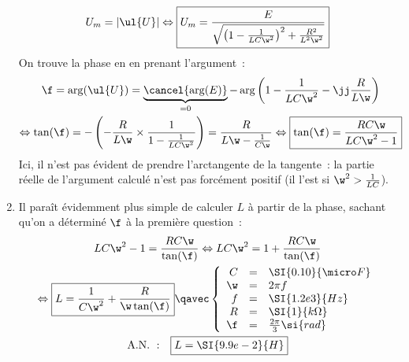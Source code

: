 \documentclass[a4paper, 12pt, final, garamond]{book}
\begin{document}
\begin{enumerate}
	      \begin{gather*}
		      U_m
		      = \left| \ul{U} \right|
		      \Leftrightarrow
		      \boxed{U_m
			      = \frac{E}{\sqrt{\left(1 - \frac{1}{LC\w^2}\right)^2 +
					      \frac{R^2}{L^2\w^2}}}
		      }
	      \end{gather*}
	      On trouve la phase en en prenant l'argument~:
	      \begin{gather*}
		      \f
		      = \arg(\ul{U})
		      = \underbrace{\cancel{\arg(E)}}_{=0}
		      - \arg \left( 1 - \frac{1}{LC\w^2} - \jj \frac{R}{L\w}
		      \right)\\
		      \Leftrightarrow
		      \tan(\f)
		      = - \left(-\frac{R}{L\w}\times \frac{1}{1 - \frac{1}{LC\w^2}}\right)
		      = \frac{R}{L\w - \frac{1}{C\w}}
		      \Leftrightarrow
		      \boxed{\tan(\f)
			      = \frac{RC\w}{LC\w^2 - 1}
		      }
	      \end{gather*}
	      Ici, il n'est pas évident de prendre l'arctangente de la tangente~: la
	      partie réelle de l'argument calculé n'est pas forcément positif (il
	      l'est si $\w^2 > \frac{1}{LC}$).
	\item Il paraît évidemment plus simple de calculer $L$ à partir de la phase,
	      sachant qu'on a déterminé $\f$ à la première question~:
	      \begin{gather*}
		      LC\w^2 - 1
		      = \frac{RC\w}{\tan(\f)}
		      \Leftrightarrow
		      LC\w^2 = 1 + \frac{RC\w}{\tan(\f)}\\
		      \Leftrightarrow
		      \boxed{L = \frac{1}{C\w^2} + \frac{R}{\w\tan(\f)}}
		      \qavec
		      \left\{
		      \begin{array}{rcl}
			      C  & = & \SI{0.10}{\micro F}    \\
			      \w & = & 2\pi f                 \\
			      f  & = & \SI{1.2e3}{Hz}         \\
			      R  & = & \SI{1}{k\Omega}        \\
			      \f & = & \frac{2\pi}{3}\si{rad}
		      \end{array}
		      \right.\\
		      \mathrm{A.N.~:}\quad
		      \boxed{L = \SI{9.9e-2}{H}}
	      \end{gather*}
\end{enumerate}
\end{document}
